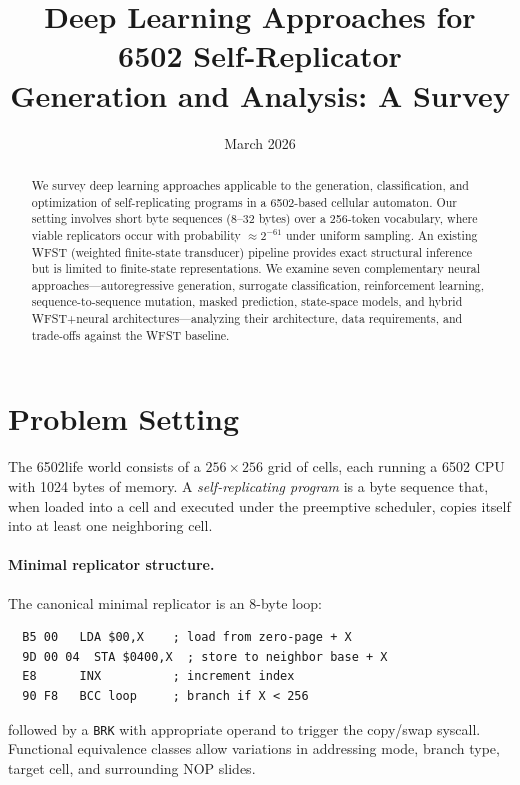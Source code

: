 \documentclass{article}
\title{Deep Learning Approaches for 6502 Self-Replicator\\Generation and Analysis: A Survey}
\author{}
\date{March 2026}
\newcommand{\opcode}[1]{\texttt{#1}}
\begin{document}
\maketitle

\begin{abstract}
We survey deep learning approaches applicable to the generation, classification,
and optimization of self-replicating programs in a 6502-based cellular automaton.
Our setting involves short byte sequences (8--32 bytes) over a 256-token vocabulary,
where viable replicators occur with probability $\approx 2^{-61}$ under uniform
sampling.  An existing WFST (weighted finite-state transducer) pipeline provides
exact structural inference but is limited to finite-state representations.
We examine seven complementary neural approaches---autoregressive generation,
surrogate classification, reinforcement learning, sequence-to-sequence mutation,
masked prediction, state-space models, and hybrid WFST+neural architectures---analyzing
their architecture, data requirements, and trade-offs against the WFST baseline.
\end{abstract}

\tableofcontents

\section{Problem Setting}
\label{sec:setting}

The 6502life world consists of a $256 \times 256$ grid of cells, each running a
6502 CPU with 1024 bytes of memory.  A \emph{self-replicating program} is a byte
sequence that, when loaded into a cell and executed under the preemptive scheduler,
copies itself into at least one neighboring cell.

\paragraph{Minimal replicator structure.}
The canonical minimal replicator is an 8-byte loop:
\begin{lstlisting}
  B5 00   LDA $00,X    ; load from zero-page + X
  9D 00 04  STA $0400,X  ; store to neighbor base + X
  E8      INX          ; increment index
  90 F8   BCC loop     ; branch if X < 256
\end{lstlisting}
followed by a \opcode{BRK} with appropriate operand to trigger the copy/swap
syscall.  Functional equivalence classes allow variations in addressing mode,
branch type, target cell, and surrounding NOP slides.
\end{document}
